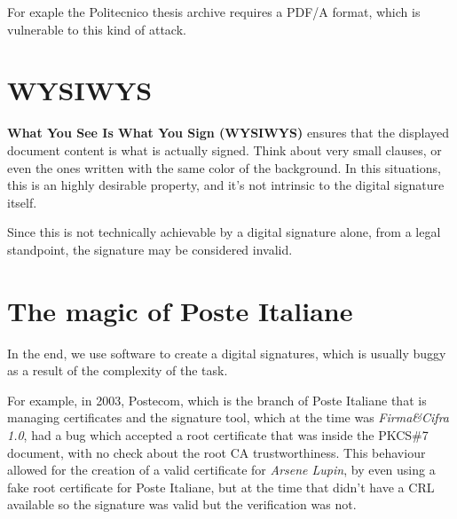 For exaple the Politecnico thesis archive requires a PDF/A format,
which is vulnerable to this kind of attack.

\section{WYSIWYS}
\textbf{What You See Is What You Sign (WYSIWYS)} ensures that the
displayed document content is what is actually signed. 
Think about very small clauses, or even the ones written with the same
color of the background. In this situations, this is an highly
desirable property, and it's not intrinsic to the digital signature 
itself.

Since this is not technically achievable by a digital signature alone,
from a legal standpoint, the signature may be considered invalid.

\section{The magic of Poste Italiane}
In the end, we use software to create a digital signatures, which is
usually buggy as a result of the complexity of the task. 

For example, in 2003, Postecom, which is the branch of Poste Italiane
that is managing certificates and the signature tool, which at the
time was \textit{Firma\&Cifra 1.0}, had a bug which accepted a root
certificate that was inside the PKCS\#7 document, with no check about
the root CA trustworthiness. This behaviour allowed for the creation
of a valid certificate for \textit{Arsene Lupin}, by even using a fake
root certificate for Poste Italiane, but at the time that
didn't have a CRL available so the signature was valid but the
verification was not.


